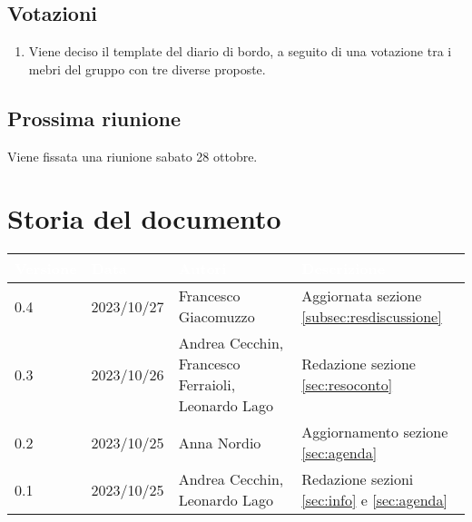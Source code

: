 \documentclass[12pt]{article}
\begin{document}
\begin{enumerate}
\end{enumerate}

\subsection{Votazioni} \label{subsec:resvotazione}
\begin{enumerate}
    \item Viene deciso il template del diario di bordo, a seguito di una votazione tra i mebri del gruppo con tre diverse proposte.
\end{enumerate}

\subsection{Prossima riunione} \label{subsec:riunione}
Viene fissata una riunione sabato 28 ottobre.

\section{Storia del documento} \label{sec:storia}
\begingroup
\setlength{\tabcolsep}{10pt}
\renewcommand{\arraystretch}{1.5}
\begin{tabularx}{\textwidth}{| l | l | X | X |}
    \hline
    \rowcolor{headerrow} \textbf{\textcolor{white}{Versione}} & \textbf{\textcolor{white}{Data}} & \textbf{\textcolor{white}{Autori}} & \textbf{\textcolor{white}{Descrizione}} \\
     \hline
    0.4 & 2023/10/27 & Francesco Giacomuzzo & Aggiornata sezione \ref{subsec:resdiscussione}\\
    \hline
    0.3 & 2023/10/26 & Andrea Cecchin, Francesco Ferraioli, Leonardo Lago & Redazione sezione \ref{sec:resoconto}\\
    \hline
    0.2 & 2023/10/25 & Anna Nordio & Aggiornamento sezione \ref{sec:agenda}\\
    \hline
    0.1 & 2023/10/25 & Andrea Cecchin, Leonardo Lago & Redazione sezioni \ref{sec:info} e \ref{sec:agenda}\\
    \hline
\end{tabularx}
\endgroup
\end{document}
